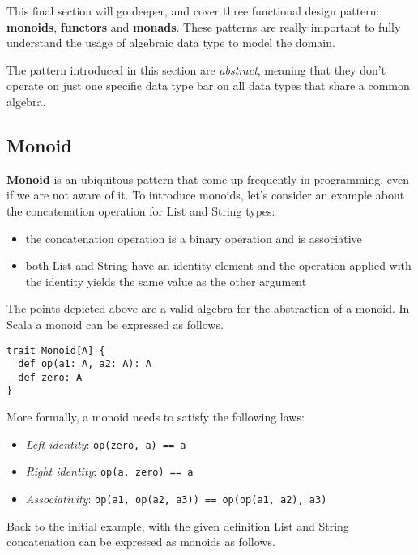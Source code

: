 This final section will go deeper, and cover three functional design
pattern: \textbf{monoids}, \textbf{functors} and \textbf{monads}. These
patterns are really important to fully understand the usage of algebraic
data type to model the domain.

The pattern introduced in this section are \emph{abstract}, meaning that
they don't operate on just one specific data type bar on all data types
that share a common algebra.

\subsection{Monoid}\label{monoid}

\textbf{Monoid} is an ubiquitous pattern that come up frequently in
programming, even if we are not aware of it. To introduce monoids, let's
consider an example about the concatenation operation for List and
String types:

\begin{itemize}
\itemsep1pt\parskip0pt
\item
  the concatenation operation is a binary operation and is associative
\item
  both List and String have an identity element and the operation
  applied with the identity yields the same value as the other argument
\end{itemize}

The points depicted above are a valid algebra for the abstraction of a
monoid. In Scala a monoid can be expressed as follows.

\begin{verbatim}
trait Monoid[A] {
  def op(a1: A, a2: A): A
  def zero: A
}
\end{verbatim}

More formally, a monoid needs to satisfy the following laws:

\begin{itemize}
\itemsep1pt\parskip0pt
\item
  \emph{Left identity}: \texttt{op(zero,\ a)\ ==\ a}
\item
  \emph{Right identity}: \texttt{op(a,\ zero)\ ==\ a}
\item
  \emph{Associativity}:
  \texttt{op(a1,\ op(a2,\ a3))\ ==\ op(op(a1,\ a2),\ a3)}
\end{itemize}

Back to the initial example, with the given definition List and String
concatenation can be expressed as monoids as follows.

